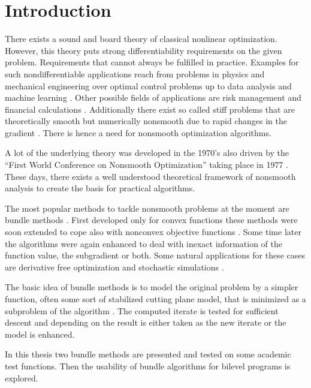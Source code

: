 \section{Introduction}

There exists a sound and board theory of classical nonlinear optimization. However, this theory puts strong differentiability requirements on the given problem. Requirements that cannot always be fulfilled in practice.
Examples for such nondifferentiable applications reach from problems in physics and mechanical engineering \cite{Clarke1990} over optimal control problems up to data analysis \cite{Bagirov2014} and machine learning \cite{Smola2007}.
Other possible fields of applications are risk management and financial calculations \cite{Nesterov2016,Teo2010}. 
Additionally there exist so called stiff problems that are theoretically smooth but numerically nonsmooth due to rapid changes in the gradient \cite{Maekelae1992}. There is hence a need for nonsmooth optimization algorithms.

A lot of the underlying theory was developed in the 1970's also driven by the ``First World Conference on Nonsmooth Optimization'' taking place in 1977 \cite{Mifflin2012}.
These days, there exists a well understood theoretical framework of nonsmooth analysis to create the basis for practical algorithms.

The most popular methods to tackle nonsmooth problems at the moment are bundle methods \cite{Hare2016}. First developed only for convex functions \cite{Lemarechal1978} these methods were soon extended to cope also with nonconvex objective functions \cite{Mifflin1982}.
Some time later the algorithms were again enhanced to deal with inexact information of the function value, the subgradient or both.
Some natural applications for these cases are derivative free optimization and stochastic simulations \cite{Hare2016}.



The basic idea of bundle methods is to model the original problem by a simpler function, often some sort of stabilized cutting plane model, that is minimized as a subproblem of the algorithm \cite[chapter XV]{Hiriart-Urruty1993}. 
The computed iterate is tested for sufficient descent and depending on the result is either taken as the new iterate or the model is enhanced.

In this thesis two bundle methods are presented and tested on some academic test functions. Then the usability of bundle algorithms for bilevel programs is explored.

